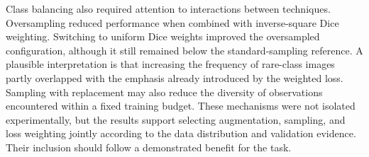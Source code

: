 Class balancing also required attention to interactions between techniques. Oversampling reduced performance when combined with inverse-square Dice weighting. Switching to uniform Dice weights improved the oversampled configuration, although it still remained below the standard-sampling reference. A plausible interpretation is that increasing the frequency of rare-class images partly overlapped with the emphasis already introduced by the weighted loss. Sampling with replacement may also reduce the diversity of observations encountered within a fixed training budget. These mechanisms were not isolated experimentally, but the results support selecting augmentation, sampling, and loss weighting jointly according to the data distribution and validation evidence. Their inclusion should follow a demonstrated benefit for the task.

